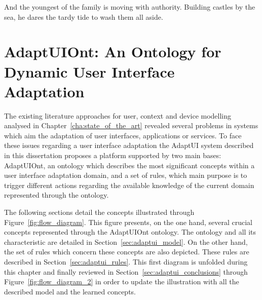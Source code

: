 
\begin{savequote}[50mm]
And the youngest of the family is moving with authority. Building castles by the 
sea, he dares the tardy tide to wash them all aside.
\end{savequote}


\chapter{AdaptUIOnt: An Ontology for Dynamic User Interface Adaptation}
\label{cha:ontology_model}

\ifpdf
    \graphicspath{{3_ontology_model/figures/PNG/}{3_ontology_model/figures/PDF/}{3_ontology_model/figures/}}
\else
    \graphicspath{{3_ontology_model/figures/EPS/}{3_ontology_model/figures/}}
\fi

The existing literature approaches for user, context and device modelling
analysed in Chapter~\ref{cha:state_of_the_art} revealed several problems in
systems which aim the adaptation of user interfaces, applications or services.
To face these issues regarding a user interface adaptation the AdaptUI system
described in this dissertation proposes a platform supported by two main bases:
AdaptUIOnt, an ontology which describes the most significant concepts within a
user interface adaptation domain, and a set of rules, which main purpose is
to trigger different actions regarding the available knowledge of the current
domain represented through the ontology.

The following sections detail the concepts illustrated through Figure~\ref{fig:flow_diagram}.
This figure presents, on the one hand, several crucial concepts represented
through the AdaptUIOnt ontology. The ontology and all its characteristic are
detailed in Section~\ref{sec:adaptui_model}. On the other hand, the set of rules
which concern these concepts are also depicted. These rules are described in
Section~\ref{sec:adaptui_rules}. This first diagram is unfolded during this
chapter and finally reviewed in Section~\ref{sec:adaptui_conclusions} through
Figure~\ref{fig:flow_diagram_2} in order to update the illustration with all the
described model and the learned concepts.


